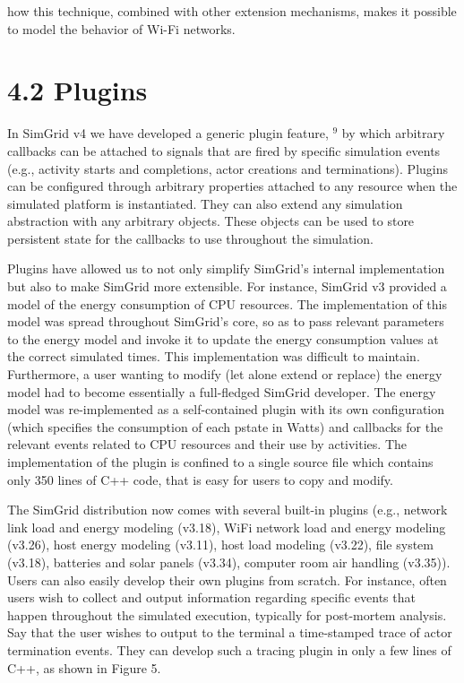 \documentclass[
]{article}
\begin{document}
how this technique, combined with other extension mechanisms, makes it
possible to model the behavior of Wi-Fi networks.

\section{4.2 Plugins}\label{plugins}

In SimGrid v4 we have developed a generic plugin feature, \(^{9}\) by
which arbitrary callbacks can be attached to signals that are fired by
specific simulation events (e.g., activity starts and completions, actor
creations and terminations). Plugins can be configured through arbitrary
properties attached to any resource when the simulated platform is
instantiated. They can also extend any simulation abstraction with any
arbitrary objects. These objects can be used to store persistent state
for the callbacks to use throughout the simulation.

Plugins have allowed us to not only simplify SimGrid's internal
implementation but also to make SimGrid more extensible. For instance,
SimGrid v3 provided a model of the energy consumption of CPU resources.
The implementation of this model was spread throughout SimGrid's core,
so as to pass relevant parameters to the energy model and invoke it to
update the energy consumption values at the correct simulated times.
This implementation was difficult to maintain. Furthermore, a user
wanting to modify (let alone extend or replace) the energy model had to
become essentially a full-fledged SimGrid developer. The energy model
was re-implemented as a self-contained plugin with its own configuration
(which specifies the consumption of each pstate in Watts) and callbacks
for the relevant events related to CPU resources and their use by
activities. The implementation of the plugin is confined to a single
source file which contains only 350 lines of C++ code, that is easy for
users to copy and modify.

The SimGrid distribution now comes with several built-in plugins (e.g.,
network link load and energy modeling (v3.18), WiFi network load and
energy modeling (v3.26), host energy modeling (v3.11), host load
modeling (v3.22), file system (v3.18), batteries and solar panels
(v3.34), computer room air handling (v3.35)). Users can also easily
develop their own plugins from scratch. For instance, often users wish
to collect and output information regarding specific events that happen
throughout the simulated execution, typically for post-mortem analysis.
Say that the user wishes to output to the terminal a time-stamped trace
of actor termination events. They can develop such a tracing plugin in
only a few lines of C++, as shown in Figure 5.
\end{document}
